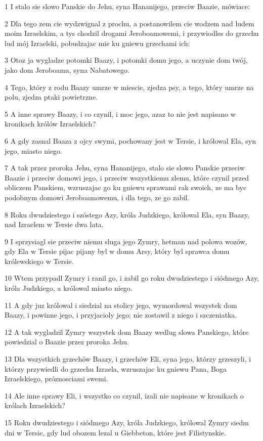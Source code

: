 \par 1 I stalo sie slowo Panskie do Jehu, syna Hananijego, przeciw Baazie, mówiace:
\par 2 Dla tego zem cie wydzwignal z prochu, a postanowilem cie wodzem nad ludem moim Izraelskim, a tys chodzil drogami Jeroboamowemi, i przywiodles do grzechu lud mój Izraelski, pobudzajac mie ku gniewu grzechami ich:
\par 3 Otoz ja wygladze potomki Baazy, i potomki domu jego, a uczynie dom twój, jako dom Jeroboama, syna Nabatowego.
\par 4 Tego, który z rodu Baazy umrze w miescie, zjedza psy, a tego, który umrze na polu, zjedza ptaki powietrzne.
\par 5 A inne sprawy Baazy, i co czynil, i moc jego, azaz to nie jest napisano w kronikach królów Izraelskich?
\par 6 A gdy zasnal Baaza z ojcy swymi, pochowany jest w Tersie, i królowal Ela, syn jego, miasto niego.
\par 7 A tak przez proroka Jehu, syna Hananijego, stalo sie slowo Panskie przeciw Baazie i przeciw domowi jego, i przeciw wszystkiemu zlemu, które czynil przed obliczem Panskiem, wzruszajac go ku gniewu sprawami rak swoich, ze ma byc podobnym domowi Jeroboamowemu, i dla tego, ze go zabil.
\par 8 Roku dwudziestego i szóstego Azy, króla Judzkiego, królowal Ela, syn Baazy, nad Izraelem w Tersie dwa lata.
\par 9 I sprzysiagl sie przeciw niemu sluga jego Zymry, hetman nad polowa wozów, gdy Ela w Tersie pijac pijany byl w domu Arsy, który byl sprawca domu królewskiego w Tersie.
\par 10 Wtem przypadl Zymry i ranil go, i zabil go roku dwudziestego i siódmego Azy, króla Judzkiego, a królowal miasto niego.
\par 11 A gdy juz królowal i siedzial na stolicy jego, wymordowal wszystek dom Baazy, i powinne jego, i przyjacioly jego; nie zostawil z niego i szczeniatka.
\par 12 A tak wygladzil Zymry wszystek dom Baazy wedlug slowa Panskiego, które powiedzial o Baazie przez proroka Jehu.
\par 13 Dla wszystkich grzechów Baazy, i grzechów Eli, syna jego, którzy grzeszyli, i którzy przywiedli do grzechu Izraela, wzruszajac ku gniewu Pana, Boga Izraelskiego, próznosciami swemi.
\par 14 Ale inne sprawy Eli, i wszystko co czynil, izali nie napisane w kronikach o królach Izraelskich?
\par 15 Roku dwudziestego i siódmego Azy, króla Judzkiego, królowal Zymry siedm dni w Tersie, gdy lud obozem lezal u Giebbeton, które jest Filistynskie.
